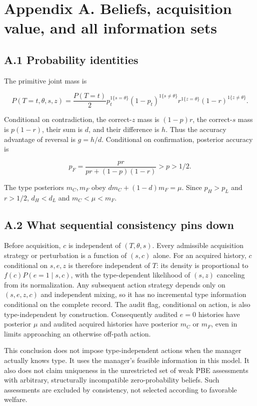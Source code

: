 \documentclass[
  11pt,
]{article}
\begin{document}
\section{Appendix A. Beliefs, acquisition value, and all information
sets}\label{appendix-a.-beliefs-acquisition-value-and-all-information-sets}

\subsection{A.1 Probability
identities}\label{a.1-probability-identities}

The primitive joint mass is

\[P(T=t,\theta,s,z)=\frac{P(T=t)}{2}
 p_t^{1\{s=\theta\}}(1-p_t)^{1\{s\ne\theta\}}
 r^{1\{z=\theta\}}(1-r)^{1\{z\ne\theta\}}.\]

Conditional on contradiction, the correct-\(z\) mass is \((1-p)r\), the
correct-\(s\) mass is \(p(1-r)\), their sum is \(d\), and their
difference is \(h\). Thus the accuracy advantage of reversal is
\(g=h/d\). Conditional on confirmation, posterior accuracy is

\[p_F=\frac{pr}{pr+(1-p)(1-r)}>p>1/2.\]

The type posteriors \(m_C,m_F\) obey \(dm_C+(1-d)m_F=\mu\). Since
\(p_H>p_L\) and \(r>1/2\), \(d_H<d_L\) and \(m_C<\mu<m_F\).

\subsection{A.2 What sequential consistency pins
down}\label{a.2-what-sequential-consistency-pins-down}

Before acquisition, \(c\) is independent of \((T,\theta,s)\). Every
admissible acquisition strategy or perturbation is a function of
\((s,c)\) alone. For an acquired history, \(c\) conditional on \(s,e,z\)
is therefore independent of \(T\): its density is proportional to
\(f(c)P(e=1\mid s,c)\), with the type-dependent likelihood of \((s,z)\)
canceling from its normalization. Any subsequent action strategy depends
only on \((s,e,z,c)\) and independent mixing, so it has no incremental
type information conditional on the complete record. The audit flag,
conditional on action, is also type-independent by construction.
Consequently audited \(e=0\) histories have posterior \(\mu\) and
audited acquired histories have posterior \(m_C\) or \(m_F\), even in
limits approaching an otherwise off-path action.

This conclusion does not impose type-independent actions when the
manager actually knows type. It uses the manager's feasible information
in this model. It also does not claim uniqueness in the unrestricted set
of weak PBE assessments with arbitrary, structurally incompatible
zero-probability beliefs. Such assessments are excluded by consistency,
not selected according to favorable welfare.
\end{document}
